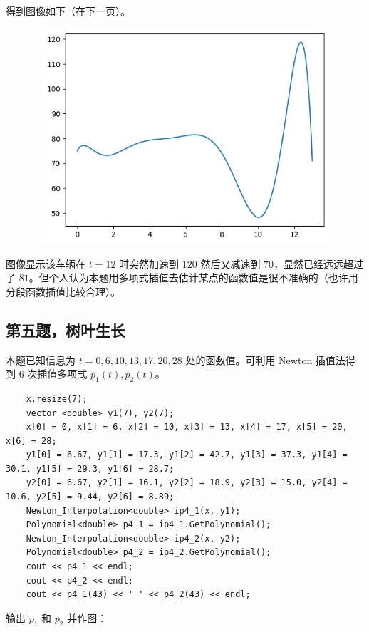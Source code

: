 \documentclass{ctexart}
\begin{document}
得到图像如下（在下一页）。

\begin{figure}[h]
    \begin{minipage}{4cm}
	\includegraphics[width = 12cm, height = 8cm]{4.png}
	\label{fig2}
	\end{minipage}
\end{figure}

图像显示该车辆在 $t=12$ 时突然加速到 $120$ 然后又减速到 $70$，显然已经远远超过了 $81$。但个人认为本题用多项式插值去估计某点的函数值是很不准确的（也许用分段函数插值比较合理）。

\subsection{第五题，树叶生长}

本题已知信息为 $t=0,6,10,13,17,20,28$ 处的函数值。可利用 Newton 插值法得到 $6$ 次插值多项式 $p_1(t),p_2(t)$。

\begin{verbatim}
    x.resize(7);
    vector <double> y1(7), y2(7);
    x[0] = 0, x[1] = 6, x[2] = 10, x[3] = 13, x[4] = 17, x[5] = 20, x[6] = 28;
    y1[0] = 6.67, y1[1] = 17.3, y1[2] = 42.7, y1[3] = 37.3, y1[4] = 30.1, y1[5] = 29.3, y1[6] = 28.7;
    y2[0] = 6.67, y2[1] = 16.1, y2[2] = 18.9, y2[3] = 15.0, y2[4] = 10.6, y2[5] = 9.44, y2[6] = 8.89;
    Newton_Interpolation<double> ip4_1(x, y1);
    Polynomial<double> p4_1 = ip4_1.GetPolynomial();
    Newton_Interpolation<double> ip4_2(x, y2);
    Polynomial<double> p4_2 = ip4_2.GetPolynomial();
    cout << p4_1 << endl;
    cout << p4_2 << endl;
    cout << p4_1(43) << ' ' << p4_2(43) << endl;
\end{verbatim}

输出 $p_1$ 和 $p_2$ 并作图：
\end{document}
